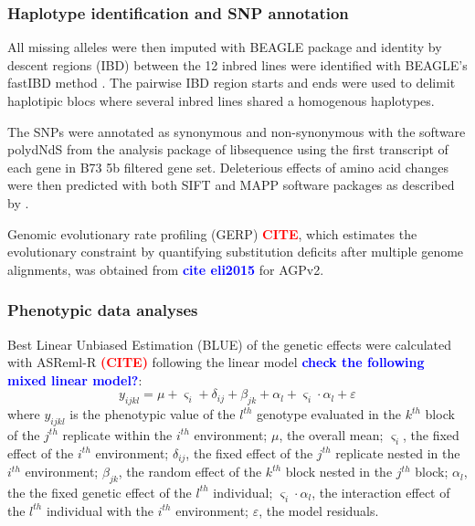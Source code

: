\documentclass[10pt]{article}
\newcommand{\sme}[1]{\textcolor{red}{\bf #1}}
\newcommand{\yang}[1]{\textcolor{blue}{\bf #1}}
\begin{document}
\subsubsection*{Haplotype identification and SNP annotation}

All missing alleles were then imputed with BEAGLE package \citep{Browning2009} and identity by descent regions (IBD) between the 12 inbred lines were identified with BEAGLE's fastIBD method \citep{Browning2011}. The pairwise IBD region starts and ends were used to delimit haplotipic blocs where several inbred lines shared a homogenous haplotypes.%

The SNPs were annotated as synonymous and non-synonymous with the software polydNdS from the analysis package of libsequence  \citep{Thornton2003} using the first transcript of each gene in B73 5b filtered gene set. Deleterious effects of amino acid changes were then predicted with both SIFT \citep{Ng2003, Ng2006} and MAPP \citep{Stone2005} software packages as described by \citep{Mezmouk2014}.

Genomic evolutionary rate profiling (GERP) \sme{CITE}, which estimates the evolutionary constraint by quantifying substitution deficits after multiple genome alignments, was obtained from \yang{cite eli2015} for AGPv2. 



\subsubsection*{Phenotypic data analyses}

Best Linear Unbiased Estimation (BLUE) of the genetic effects were calculated with ASReml-R \sme{(CITE)} following the linear model \yang{check the following mixed linear model?}: 
%
\[y_{ijkl} = \mu + \varsigma_{i} + \delta_{ij} + \beta_{jk} + \alpha_{l} +  \varsigma_{i} \cdot \alpha_{l} + \varepsilon\]
%
where 
$y_{ijkl}$ is the phenotypic value of the $l^{th}$ genotype evaluated in the $k^{th}$ block of the $j^{th}$ replicate within the $i^{th}$ environment; 
$\mu$, the overall mean; 
$\varsigma_{i}$, the fixed effect of the $i^{th}$ environment;
$\delta_{ij}$, the fixed effect of the $j^{th}$ replicate nested in the $i^{th}$ environment; 
$\beta_{jk}$, the random effect of the $k^{th}$ block nested in the $j^{th}$ block; 
$\alpha_{l}$, the the fixed genetic effect  of the $l^{th}$ individual; 
$\varsigma_{i} \cdot \alpha_{l}$, the interaction effect of the $l^{th}$ individual with the $i^{th}$ environment; 
$\varepsilon$, the model residuals.
\end{document}
